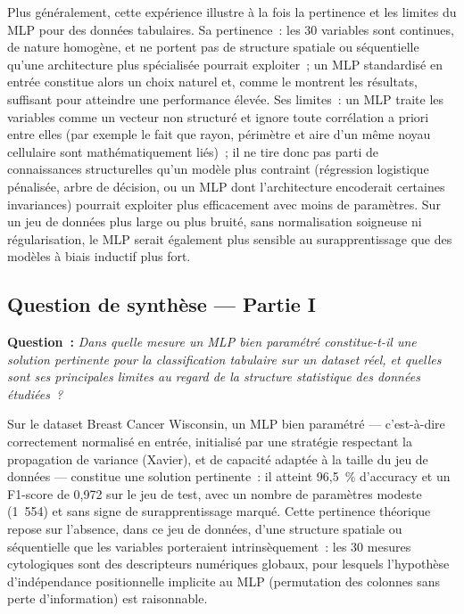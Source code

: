\documentclass[11pt,a4paper]{article}
\begin{document}
Plus généralement, cette expérience illustre à la fois la pertinence et les limites du MLP pour des données tabulaires. Sa pertinence~: les 30 variables sont continues, de nature homogène, et ne portent pas de structure spatiale ou séquentielle qu'une architecture plus spécialisée pourrait exploiter~; un MLP standardisé en entrée constitue alors un choix naturel et, comme le montrent les résultats, suffisant pour atteindre une performance élevée. Ses limites~: un MLP traite les variables comme un vecteur non structuré et ignore toute corrélation a priori entre elles (par exemple le fait que rayon, périmètre et aire d'un même noyau cellulaire sont mathématiquement liés)~; il ne tire donc pas parti de connaissances structurelles qu'un modèle plus contraint (régression logistique pénalisée, arbre de décision, ou un MLP dont l'architecture encoderait certaines invariances) pourrait exploiter plus efficacement avec moins de paramètres. Sur un jeu de données plus large ou plus bruité, sans normalisation soigneuse ni régularisation, le MLP serait également plus sensible au surapprentissage que des modèles à biais inductif plus fort.

\subsection{Question de synthèse --- Partie I}

\noindent\textbf{Question~:} \textit{Dans quelle mesure un MLP bien paramétré constitue-t-il une solution pertinente pour la classification tabulaire sur un dataset réel, et quelles sont ses principales limites au regard de la structure statistique des données étudiées~?}

\medskip
Sur le dataset Breast Cancer Wisconsin, un MLP bien paramétré --- c'est-à-dire correctement normalisé en entrée, initialisé par une stratégie respectant la propagation de variance (Xavier), et de capacité adaptée à la taille du jeu de données --- constitue une solution pertinente~: il atteint 96,5~\% d'accuracy et un F1-score de 0,972 sur le jeu de test, avec un nombre de paramètres modeste (1~554) et sans signe de surapprentissage marqué. Cette pertinence théorique repose sur l'absence, dans ce jeu de données, d'une structure spatiale ou séquentielle que les variables porteraient intrinsèquement~: les 30 mesures cytologiques sont des descripteurs numériques globaux, pour lesquels l'hypothèse d'indépendance positionnelle implicite au MLP (permutation des colonnes sans perte d'information) est raisonnable.
\end{document}
